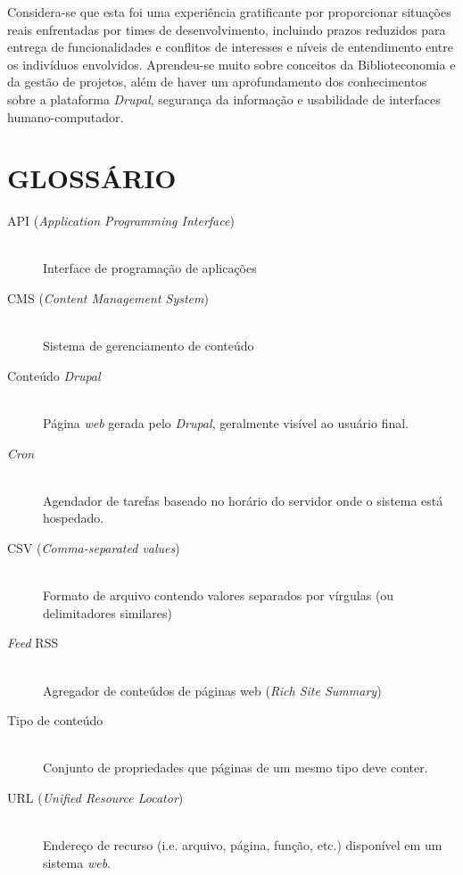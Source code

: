 \documentclass[a4paper]{article}
\begin{document}
Considera-se que esta foi uma experiência gratificante por proporcionar situações reais enfrentadas por times de desenvolvimento, incluindo prazos reduzidos para entrega de funcionalidades e conflitos de interesses e níveis de entendimento entre os indivíduos envolvidos. Aprendeu-se muito sobre conceitos da Biblioteconomia e da gestão de projetos, além de haver um aprofundamento dos conhecimentos sobre a plataforma \textit{Drupal}, segurança da informação e usabilidade de interfaces humano-computador.

\pagebreak
\section{GLOSSÁRIO}
\begin{description}
\item[API (\textit{Application Programming Interface})] \hfill \\ Interface de programação de aplicações
\item[CMS (\textit{Content Management System})] \hfill \\ Sistema de gerenciamento de conteúdo
\item[Conteúdo \textit{Drupal}] \hfill \\ Página \textit{web} gerada pelo \textit{Drupal}, geralmente visível ao usuário final.
\item[\textit{Cron}] \hfill \\ Agendador de tarefas baseado no horário do servidor onde o sistema está hospedado.
\item[CSV (\textit{Comma-separated values})] \hfill \\ Formato de arquivo contendo valores separados por vírgulas (ou delimitadores similares)
\item[\textit{Feed} RSS] \hfill \\ Agregador de conteúdos de páginas web (\textit{Rich Site Summary})
\item[Tipo de conteúdo] \hfill \\ Conjunto de propriedades que páginas de um mesmo tipo deve conter.
\item[URL (\textit{Unified Resource Locator})] \hfill \\ Endereço de recurso (i.e. arquivo, página, função, etc.) disponível em um sistema \textit{web}.
\end{description}
\end{document}
